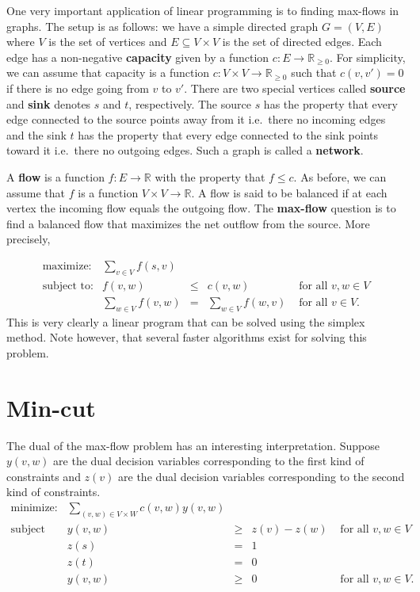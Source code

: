 \documentclass[
]{book}
\theoremstyle{definition}
\theoremstyle{definition}
\theoremstyle{definition}
\theoremstyle{definition}
\theoremstyle{remark}
\begin{document}
One very important application of linear programming is to finding max-flows in graphs.
The setup is as follows:
we have a simple directed graph \(G = (V, E)\) where \(V\) is the set of vertices and \(E \subseteq V \times V\) is the set of directed edges. Each edge has a non-negative \textbf{capacity} given by a function \(c: E \to \mathbb{R}_{\ge 0}\).
For simplicity, we can assume that capacity is a function \(c : V \times V \to \mathbb{R}_{\ge 0}\) such that \(c(v, v') = 0\) if there is no edge going from \(v\) to \(v'\).
There are two special vertices called \textbf{source} and \textbf{sink} denotes \(s\) and \(t\), respectively.
The source \(s\) has the property that every edge connected to the source points away from it i.e.~there no incoming edges and the sink \(t\) has the property that every edge connected to the sink points toward it i.e.~there no outgoing edges.
Such a graph is called a \textbf{network}.

A \textbf{flow} is a function \(f : E \to \mathbb{R}\) with the property that \(f \le c\). As before, we can assume that \(f\) is a function \(V \times V \to \mathbb{R}\). A flow is said to be balanced if at each vertex the incoming flow equals the outgoing flow. The \textbf{max-flow} question is to find a balanced flow that maximizes the net outflow from the source. More precisely,

\begin{equation*}
\begin{array}{lrllllllllll}
  \mbox{maximize:} & \sum \limits_{v \in V} f(s, v) \\
  \mbox{subject to:} 
  & f(v, w) & \le & c(v, w) & \mbox{ for all } v, w \in V \\
  & \sum \limits_{w \in V} f(v, w) & = & \sum \limits_{w \in V} f(w, v) & \mbox{ for all } v \in V.
\end{array}
\end{equation*}
This is very clearly a linear program that can be solved using the simplex method.
Note however, that several faster algorithms exist for solving this problem.

\hypertarget{min-cut}{%
\section{Min-cut}\label{min-cut}}

The dual of the max-flow problem has an interesting interpretation.
Suppose \(y(v, w)\) are the dual decision variables corresponding to the first kind of constraints and \(z(v)\) are the dual decision variables corresponding to the second kind of constraints.
\begin{equation*}
\begin{array}{lrllllllllll}
  \mbox{minimize:} & \sum \limits_{(v, w) \in V \times W} c(v, w) y(v, w) \\
  \mbox{subject to:} 
  & y(v, w) & \ge & z(v) - z(w) & \mbox{ for all } v, w \in V \\
  & z(s) &= &1 \\
  &z(t) &= &0 \\
  & y(v,w) & \ge & 0 &  \mbox{ for all } v, w \in V. 
\end{array}
\end{equation*}
\end{document}
